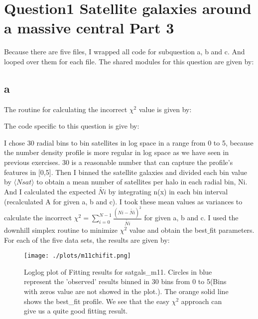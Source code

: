 \section{Question1 Satellite galaxies around a massive central Part 3}
Because there are five files, I wrapped all code for subquestion a, b and c. And looped over them for each file.
The shared modules for this question are given by:


\subsection{a}

The routine for calculating the incorrect $\chi ^{2}$ value is given by:

The code specific to this question is give by:


I chose 30 radial bins to bin satellites in log space in a range from 0 to 5, because the number density profile is more regular in log space as we have seen in previous exercises. 30 is a reasonable number that can capture the profile's features in [0,5].
Then I binned the satellite galaxies and divided each bin value by $\langle Nsat \rangle$ to obtain a mean number of satellites per halo in each radial bin, Ni. And I calculated the expected $\tilde{Ni}$ by integrating n(x) in each bin interval (recalculated A for given a, b and c). I took these mean values as variances to calculate the incorrect $\chi ^{2}= \sum_{i=0}^{N-1}\frac{(Ni - \tilde{Ni})^2}{\tilde{Ni}}$ for given a, b and c. I used the downhill simplex routine to minimize $\chi^{2}$ value and obtain the best$\_$fit parameters.\\
For each of the five data sets, the results are given by:


\begin{figure}[h!]
  \centering
  \texttt{[image: ./plots/m11chifit.png]}
  \caption{Loglog plot of Fitting results for satgals\_m11. Circles in blue represent the 'observed' results binned in 30 bins from 0 to 5(Bins with zeros value are not showed in the plot.). The orange solid line shows the best\_fit profile. We see that the easy $\chi ^{2}$ approach can give us a quite good fitting result.}
  \label{fig1}
\end{figure}



